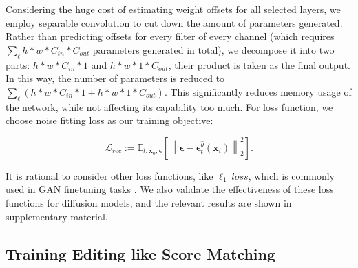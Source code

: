\documentclass[letterpaper]{article} %
\begin{document}
Considering the huge cost of estimating weight offsets for all selected layers,
we employ separable convolution \cite{alaluf2022hyperstyle} to cut down the amount of parameters generated. Rather than predicting offsets for every filter of every channel (which requires $\sum_{\ell}h * w * C_{in} * C_{out}$ parameters generated in total), we decompose it into two parts: $h*w*C_{in}*1$ and $h*w*1*C_{out}$, their product is taken as the final output. In this way, the number of parameters is reduced to $\sum_{\ell}(h*w*C_{in}*1 + h*w*1*C_{out})$.
This significantly reduces memory usage of the network, while not affecting its capability too much. For loss function, we choose noise fitting loss as our training objective:

\begin{equation}
    \mathcal{L}_{rec} := \mathbb{E}_{t,\bm{x}_0,\bm{\epsilon}}\left [ \left \| \bm{\epsilon} - \bm{\epsilon}_{t}^{\hat{\theta}}(\bm{x}_t) \right \|_{2}^{2}\right].
\end{equation}

It is rational to consider other loss functions, like $\ell_1 ~loss$, which is commonly used in GAN finetuning tasks \cite{alaluf2022hyperstyle, wang2022high}. We also validate the effectiveness of these loss functions for
diffusion models, and the relevant results are shown in supplementary material.


\subsection{Training Editing like Score Matching}
\end{document}

